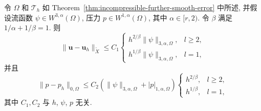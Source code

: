 \begin{Theorem}\label{thm:incompressible-further-w3alpha-error}
令 $\Omega$ 和 $\mathcal T_h$ 如
Theorem~\ref{thm:incompressible-further-smooth-error} 中所述,
并假设流函数 $\psi\in W^{3,\alpha}(\Omega)$,
压力 $p\in W^{1,\alpha}(\Omega)$, 其中 $\alpha\in[r,2)$.
令 $\beta$ 满足 $1/\alpha+1/\beta=1$.
则
\begin{equation}\label{eq:incompressible-further-w3alpha-velocity-error}
\|\mathbf u-\mathbf u_h\|_{\widetilde X}
\leq C_1
\begin{cases}
h^{2/\beta}\|\psi\|_{3,\alpha,\Omega},&l\geq2,\\
h^{1/\beta}\|\psi\|_{3,\alpha,\Omega},&l=1,
\end{cases}
\end{equation}
并且
\begin{equation}\label{eq:incompressible-further-w3alpha-pressure-error}
\|p-p_h\|_{0,\Omega}
\leq C_2(\|\psi\|_{3,\alpha,\Omega}+|p|_{1,\alpha,\Omega})
\begin{cases}
h^{2/\beta},&l\geq2,\\
h^{1/\beta},&l=1,
\end{cases}
\end{equation}
其中 $C_1,C_2$ 与 $h$, $\psi$, $p$ 无关.
\end{Theorem}

